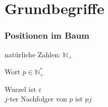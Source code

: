 % 

  \section{Grundbegriffe}

    \begin{frame}
      \frametitle{Positionen im Baum}
      \begin{Itemize}
        \item
           natürliche Zahlen: $\mathbb{N}_+$
        \item
           Wort $p \in \mathbb{N}_+^*$
      \end{Itemize}
      
      \par\bigskip
       Wurzel ist $\varepsilon$ \\
      \hspace*{7mm} $j$-ter Nachfolger von $p$ ist $pj$
      
      \par\bigskip
      \begin{center}
      \end{center}

    \end{frame}


